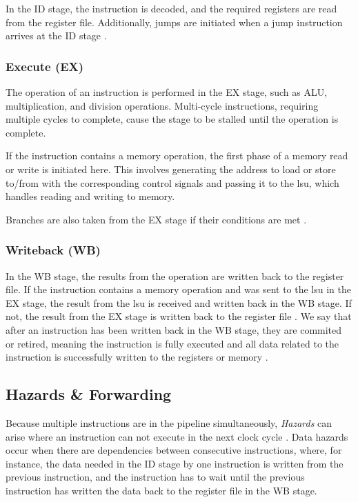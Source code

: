 In the ID stage, the instruction is decoded, and the required registers are read from the register file. Additionally, jumps are initiated when a jump instruction arrives at the ID stage \cite{openhwgroupPipelineDetailsCOREV2023}. 

\subsubsection{Execute (EX)}

The operation of an instruction is performed in the EX stage, such as ALU, multiplication, and division operations. Multi-cycle instructions, requiring multiple cycles to complete, cause the stage to be stalled until the operation is complete.

If the instruction contains a memory operation, the first phase of a memory read or write is initiated here. This involves generating the address to load or store to/from with the corresponding control signals and passing it to the \acrlong{lsu}, which handles reading and writing to memory.

Branches are also taken from the EX stage if their conditions are met \cite{openhwgroupPipelineDetailsCOREV2023}.

\subsubsection{Writeback (WB)}

In the WB stage, the results from the operation are written back to the register file. 
If the instruction contains a memory operation and was sent to the \acrshort{lsu} in the EX stage, the result from the \acrshort{lsu} is received and written back in the WB stage. If not, the result from the EX stage is written back to the register file \cite{openhwgroupPipelineDetailsCOREV2023}.
We say that after an instruction has been written back in the WB stage, they are \gls{commited} or \gls{retired}, meaning the instruction is fully executed and all data related to the instruction is successfully written to the registers or memory \cite{taylorAdvancedRISCVVerification2023}. 


\subsection{Hazards \& Forwarding}

Because multiple instructions are in the pipeline simultaneously, \textit{Hazards} can arise where an instruction can not execute in the next clock cycle \cite{pattersonComputerOrganizationDesign2021}. Data hazards occur when there are dependencies between consecutive instructions, where, for instance, the data needed in the ID stage by one instruction is written from the previous instruction, and the instruction has to wait until the previous instruction has written the data back to the register file in the WB stage.

